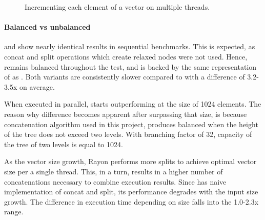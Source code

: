 \begin{figure}[!htbp]

    \label{fig:map-fold}
    \caption{Incrementing each element of a vector on multiple threads.}    
\end{figure}



\paragraph{Balanced vs unbalanced}
\rbvec{} and \rrbvec{} show nearly identical results in sequential benchmarks. This is expected, as concat and split operations which create relaxed nodes were not used. Hence, \rrbvec{} remains balanced throughout the test, and is backed by the same representation of \rrbtree{} as \rbvec{}. Both variants are consistently slower compared to \stdvec{} with a difference of 3.2-3.5x on average. 

When executed in parallel, \rrbvec{} starts outperforming \rbvec{} at the size of 1024 elements. The reason why difference becomes apparent after surpassing that size, is because concatenation algorithm used in this project, produces balanced \rbtree{} when the height of the tree does not exceed two levels. With branching factor of 32, capacity of the tree of two levels is equal to 1024. 

As the vector size growth, Rayon performs more splits to achieve optimal vector size per a single thread. This, in a turn, results in a higher number of concatenations necessary to combine execution results. Since \rbvec{} has naive implementation of concat and split, its performance degrades with the input size growth. The difference in execution time depending on size falls into the 1.0-2.3x range. 

